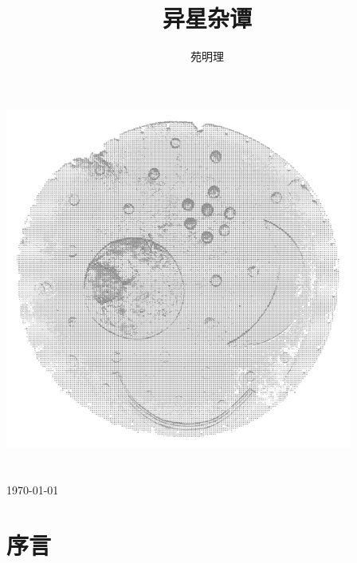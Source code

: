 \documentclass[a4paper,10.5pt]{book}
\title{异星杂谭}
\author{苑明理}
\date{}
\begin{document}

\makeatletter
    \begin{titlepage}
        \begin{center}
            \includegraphics[width=4.5in]{images/0_00-Cover.png}\\[10ex]
            {\erhao \bfseries  \@title }\\[50ex]
            {\sanhao  \@author}\\[5ex]
            {\sihao \monthyeardate\today}\\[1ex]
        \end{center}
    \end{titlepage}
\makeatother
\thispagestyle{empty}
\newpage

\newpage
\thispagestyle{empty}
\maketitle
\begin{center}
    \ccbysa
\end{center}
\thispagestyle{empty}

\newpage

\setlength{\parindent}{0em}
\setlength{\parskip}{1.2em}

\chapter*{序言}
\end{document}
